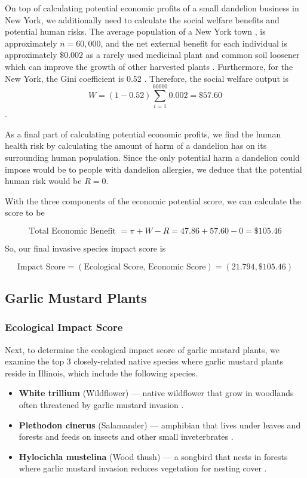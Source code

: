 On top of calculating potential economic profits of a small dandelion business in New York, we additionally need to calculate the social welfare benefits and potential human risks. The average population of a New York town , is approximately \(n = 60,000\), and the net external benefit for each individual is approximately \(\$0.002\) as a rarely used medicinal plant and common soil loosener which can improve the growth of other harvested plants \cite{healthlineDandelionHealth}. Furthermore, for the New York, the Gini coefficient is 0.52 \cite{statistaBetweenRich}. Therefore, the social welfare output is \[W = (1- 0.52) \sum_{i = 1}^{60000} 0.002 = \$57.60\].

As a final part of calculating potential economic profits, we find the human health risk by calculating the amount of harm of a dandelion has on its surrounding human population. Since the only potential harm a dandelion could impose would be to people with dandelion allergies, we deduce that the potential human risk would be \(R = 0\).

With the three components of the economic potential score, we can calculate the score to be 

\[\text{Total Economic Benefit } = \pi + W - R = 47.86 + 57.60 - 0 = \$105.46\]

So, our final invasive species impact score is

\[\text{Impact Score} = (\text{Ecological Score, Economic Score}) = (21.794, \$105.46)\]

\subsection{Garlic Mustard Plants}

\subsubsection{Ecological Impact Score}

Next, to determine the ecological impact score of garlic mustard plants, we examine the top 3 closely-related native species where garlic mustard plants reside in Illinois, which include the following species.

\begin{itemize}
    \item \textbf{White trillium} (Wildflower) — native wildflower that grow in woodlands often threatened by garlic mustard invasion \cite{usdaGreatWhite}.
    \item \textbf{Plethodon cinerus} (Salamander) — amphibian that lives under leaves and forests and feeds on insects and other small inveterbrates \cite{amphibiawebAmphibiaWebPlethodon}.
    \item \textbf{Hylocichla mustelina} (Wood thush) — a songbird that nests in forests where garlic mustard invasion reduces vegetation for nesting cover \cite{allaboutbirdsWoodThrush}.
\end{itemize}

